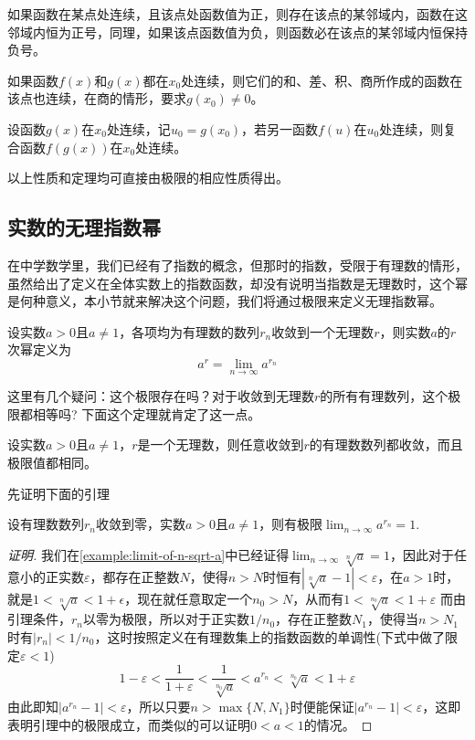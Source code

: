 \begin{inference}
  如果函数在某点处连续，且该点处函数值为正，则存在该点的某邻域内，函数在这邻域内恒为正号，同理，如果该点函数值为负，则函数必在该点的某邻域内恒保持负号。
\end{inference}

\begin{theorem}
  如果函数$f(x)$和$g(x)$都在$x_0$处连续，则它们的和、差、积、商所作成的函数在该点也连续，在商的情形，要求$g(x_0) \neq 0$。
\end{theorem}

\begin{theorem}[复合函数的连续性]
  设函数$g(x)$在$x_0$处连续，记$u_0=g(x_0)$，若另一函数$f(u)$在$u_0$处连续，则复合函数$f(g(x))$在$x_0$处连续。
\end{theorem}

以上性质和定理均可直接由极限的相应性质得出。

\subsection{实数的无理指数幂}
\label{sec:the-power-of-real-with-rational-exponent}

在中学数学里，我们已经有了指数的概念，但那时的指数，受限于有理数的情形，虽然给出了定义在全体实数上的指数函数，却没有说明当指数是无理数时，这个幂是何种意义，本小节就来解决这个问题，我们将通过极限来定义无理指数幂。

\begin{definition}
  设实数$a>0$且$a \neq 1$，各项均为有理数的数列$r_n$收敛到一个无理数$r$，则实数$a$的$r$次幂定义为
  \[ a^r = \lim_{n \to \infty} a^{r_n} \]
\end{definition}

这里有几个疑问：这个极限存在吗？对于收敛到无理数$r$的所有有理数列，这个极限都相等吗? 下面这个定理就肯定了这一点。
\begin{theorem}
  设实数$a>0$且$a \neq 1$，$r$是一个无理数，则任意收敛到$r$的有理数数列都收敛，而且极限值都相同。
\end{theorem}

先证明下面的引理
\begin{lemma}
  设有理数数列$r_n$收敛到零，实数$a>0$且$a \neq 1$，则有极限$\lim_{n \to \infty} a^{r_n} = 1$.
\end{lemma}

\begin{proof}[证明]
  我们在\autoref{example:limit-of-n-sqrt-a}中已经证得$\lim_{n \to \infty} \sqrt[n]{a} = 1$，因此对于任意小的正实数$\varepsilon$，都存在正整数$N$，使得$n>N$时恒有$|\sqrt[n]{a}-1|<\varepsilon$，在$a>1$时，就是$1<\sqrt[n]{a}<1+\epsilon$，现在就任意取定一个$n_0>N$，从而有$1<\sqrt[n_0]{a}<1+\varepsilon$ 而由引理条件，$r_n$以零为极限，所以对于正实数$1/n_0$，存在正整数$N_1$，使得当$n>N_1$时有$|r_n|<1/n_0$，这时按照定义在有理数集上的指数函数的单调性(下式中做了限定$\varepsilon<1$)
  \[ 1-\varepsilon<\frac{1}{1+\varepsilon}<\frac{1}{\sqrt[n_0]{a}}<a^{r_n}<\sqrt[n_0]{a}<1+\varepsilon \]
  由此即知$|a^{r_n}-1|<\varepsilon$，所以只要$n>\max\{N, N_1\}$时便能保证$|a^{r_n}-1|<\varepsilon$，这即表明引理中的极限成立，而类似的可以证明$0<a<1$的情况。
\end{proof}

